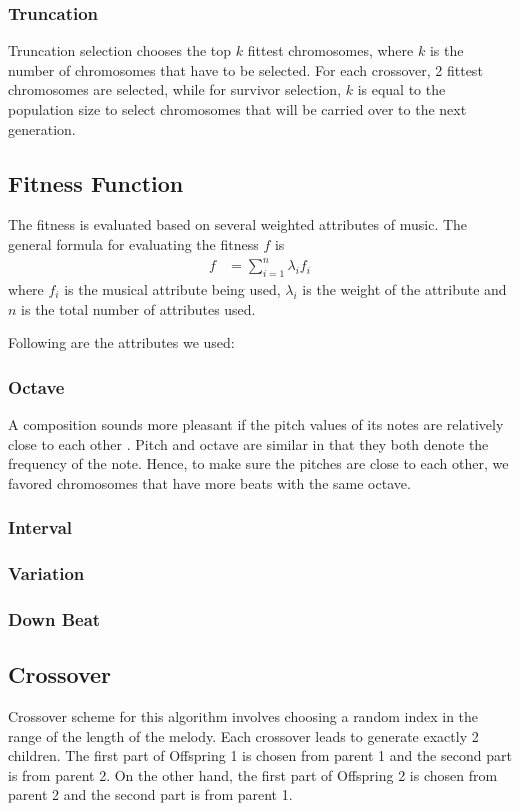 \documentclass[conference]{IEEEtran}
\begin{document}
\subsubsection{Truncation}
Truncation selection chooses the top $k$ fittest chromosomes, where $k$ is the number of chromosomes that have to be selected. For each crossover, 2 fittest chromosomes are selected, while for survivor selection, $k$ is equal to the population size to select chromosomes that will be carried over to the next generation.

\subsection{Fitness Function}
The fitness is evaluated based on several weighted attributes of music. The general formula for evaluating the fitness $f$ is
\begin{align*}
f &= \sum_{i=1}^{n} \lambda_{i}f_{i}
\end{align*}
where $f_{i}$ is the musical attribute being used, $\lambda_{i}$ is the weight of the attribute and $n$ is the total number of attributes used.

Following are the attributes we used:

\subsubsection{Octave}
A composition sounds more pleasant if the pitch values of its notes are relatively close to each other \cite{b2}. Pitch and octave are similar in that they both denote the frequency of the note. Hence, to make sure the pitches are close to each other, we favored chromosomes that have more beats with the same octave.

\subsubsection{Interval}


\subsubsection{Variation}


\subsubsection{Down Beat}


\subsection{Crossover}
Crossover scheme for this algorithm involves choosing a random index in the range of the length of the melody. Each crossover leads to generate exactly 2 children. The first part of Offspring 1 is chosen from parent 1 and the second part is from parent 2. On the other hand, the first part of Offspring 2 is chosen from parent 2 and the second part is from parent 1. \\
\end{document}
